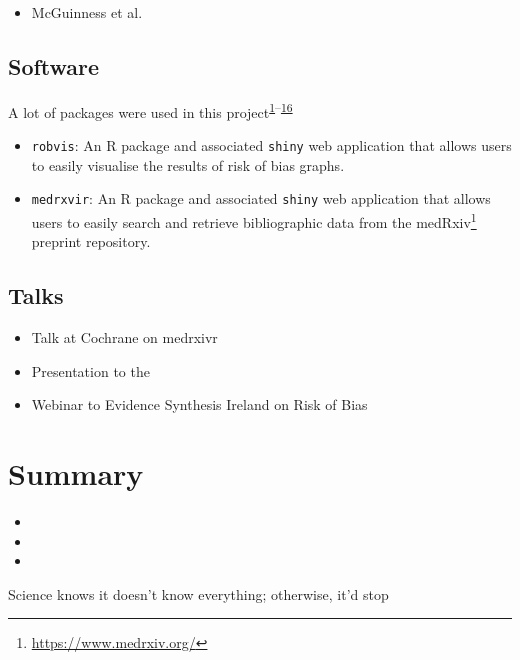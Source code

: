 \documentclass[a4paper, twoside]{templates/ociamthesis}
\providecommand{\tightlist}{%
  \setlength{\itemsep}{0pt}\setlength{\parskip}{0pt}}
\begin{document}
\begin{itemize}
\tightlist
\item
  McGuinness et al.~
\end{itemize}

\hypertarget{software}{%
\subsection{Software}\label{software}}

A lot of packages were used in this project\textsuperscript{\protect\hyperlink{ref-base}{1}--\protect\hyperlink{ref-wordcountaddin}{16}}

\begin{itemize}
\item
  \texttt{robvis}: An R package and associated \texttt{shiny} web application that allows users to easily visualise the results of risk of bias graphs.
\item
  \texttt{medrxvir}: An R package and associated \texttt{shiny} web application that allows users to easily search and retrieve bibliographic data from the medRxiv\footnote{\url{https://www.medrxiv.org/}} preprint repository.
\end{itemize}

\hypertarget{talks}{%
\subsection{Talks}\label{talks}}

\begin{itemize}
\tightlist
\item
  Talk at Cochrane on medrxivr
\item
  Presentation to the
\item
  Webinar to Evidence Synthesis Ireland on Risk of Bias
\end{itemize}

\hypertarget{summary}{%
\section{Summary}\label{summary}}

\begin{itemize}
\item
\item
\item
\end{itemize}

\begin{savequote}
Science knows it doesn't know everything; otherwise, it'd stop
\end{savequote}
\end{document}
